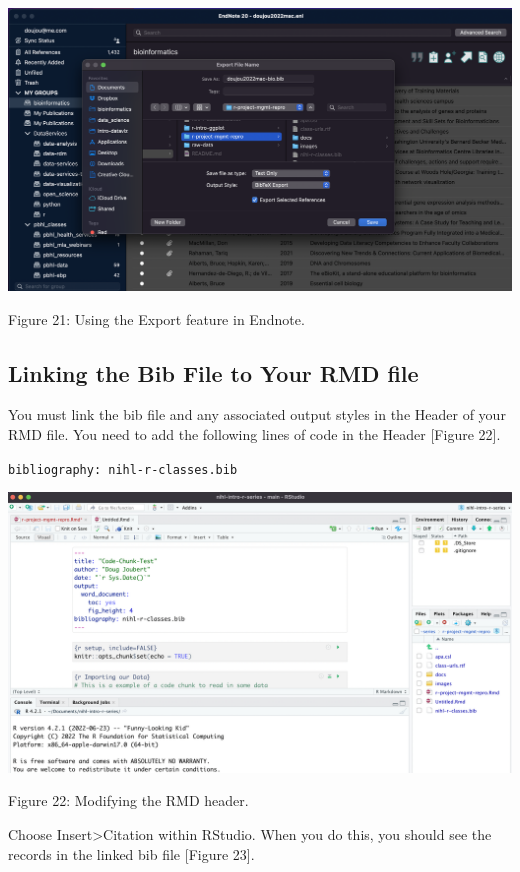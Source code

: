 \documentclass[
]{article}
\begin{document}
\includegraphics[width=6.66667in,height=\textheight]{images/bib-05.png}

Figure 21: Using the Export feature in Endnote.

\hypertarget{linking-the-bib-file-to-your-rmd-file}{%
\subsection{Linking the Bib File to Your RMD
file}\label{linking-the-bib-file-to-your-rmd-file}}

You must link the bib file and any associated output styles in the
Header of your RMD file. You need to add the following lines of code in
the Header {[}Figure 22{]}.

\texttt{bibliography:\ nihl-r-classes.bib}

\includegraphics[width=6.6875in,height=\textheight]{images/bib-06.png}

Figure 22: Modifying the RMD header.

Choose Insert\textgreater Citation within RStudio. When you do this, you
should see the records in the linked bib file {[}Figure 23{]}.
\end{document}
